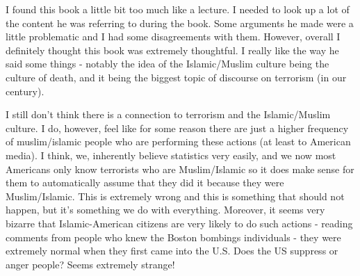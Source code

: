 \documentclass[11pt, oneside]{article}
\begin{document}
\par I found this book a little bit too much like a lecture. I needed to look up a lot of the content he was referring to during the book. Some arguments he made were a little problematic and I had some disagreements with them. However, overall I definitely thought this book was extremely thoughtful. I really like the way he said some things - notably the idea of the Islamic/Muslim culture being the culture of death, and it being the biggest topic of discourse on terrorism (in our century). 

\par I still don't think there is a connection to terrorism and the Islamic/Muslim culture. I do, however, feel like for some reason there are just a higher frequency of muslim/islamic people who are performing these actions (at least to American media). I think, we, inherently believe statistics very easily, and we now most Americans only know terrorists who are Muslim/Islamic so it does make sense for them to automatically assume that they did it because they were Muslim/Islamic. This is extremely wrong and this is something that should not happen, but it's something we do with everything. Moreover, it seems very bizarre that Islamic-American citizens are very likely to do such actions - reading comments from people who knew the Boston bombings individuals - they were extremely normal when they first came into the U.S. Does the US suppress or anger people? Seems extremely strange!
\end{document}
